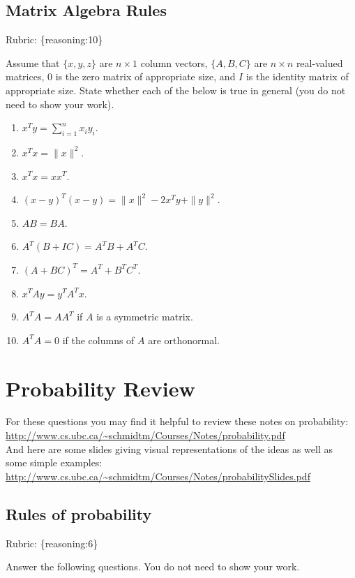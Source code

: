 \documentclass{article}
\def\rubric#1{\gre{Rubric: \{#1\}}}{}
\def\blu#1{{\color{blu}#1}}
\def\gre#1{{\color{gre}#1}}
\def\red#1{{\color{red}#1}}
\def\norm#1{\|#1\|}
\begin{document}
\subsection{Matrix Algebra Rules}
\rubric{reasoning:10}

Assume that $\{x,y,z\}$ are $n \times 1$ column vectors, $\{A,B,C\}$ are $n \times n$ real-valued matrices, \red{$0$ is the zero matrix of appropriate size}, and $I$ is the identity matrix of appropriate size. \blu{State whether each of the below is true in general} (you do not need to show your work).

\begin{enumerate}
\item $x^Ty = \sum_{i=1}^n x_iy_i$.
\item $x^Tx = \norm{x}^2$.
\item $x^Tx = xx^T$.
\item $(x-y)^T(x-y) = \norm{x}^2 - 2x^Ty + \norm{y}^2$.
\item $AB=BA$.
\item $A^T(B + IC) = A^TB + A^TC$.
\item $(A + BC)^T = A^T + B^TC^T$.
\item $x^TAy = y^TA^Tx$.
\item $A^TA = AA^T$ if $A$ is a symmetric matrix.
\item $A^TA = 0$ if the columns of $A$ are orthonormal.
\end{enumerate}

\section{Probability Review}


For these questions you may find it helpful to review these notes on probability:\\
\url{http://www.cs.ubc.ca/~schmidtm/Courses/Notes/probability.pdf}\\
And here are some slides giving visual representations of the ideas as well as some simple examples:\\
\url{http://www.cs.ubc.ca/~schmidtm/Courses/Notes/probabilitySlides.pdf}

\subsection{Rules of probability}
\rubric{reasoning:6}

\blu{Answer the following questions.} You do not need to show your work.
\end{document}
